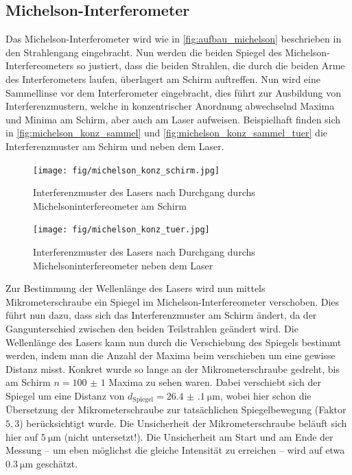 \documentclass[ngerman]{scrartcl}
\begin{document}
\subsection{Michelson-Interferometer}
\label{sec:durchfuehrung_michelson}

Das Michelson-Interferometer wird wie in \autoref{fig:aufbau_michelson} beschrieben in den Strahlengang eingebracht. Nun werden die beiden Spiegel des Michelson-Interfereometers so justiert, dass die beiden Strahlen, die durch die beiden Arme des Interferometers laufen, überlagert am Schirm auftreffen. Nun wird eine Sammellinse vor dem Interferometer eingebracht, dies führt zur Ausbildung von Interferenzmustern, welche in konzentrischer Anordnung abwechselnd Maxima und Minima am Schirm, aber auch am Laser aufweisen. Beispielhaft finden sich in \autoref{fig:michelson_konz_sammel} und \autoref{fig:michelson_konz_sammel_tuer} die Interferenzmuster am Schirm und neben dem Laser.

\setcapindent{0pt}
\begin{figure}[H]
    \centering
    \begin{minipage}[t]{0.45\linewidth}
        \centering
        \texttt{[image: fig/michelson\_konz\_schirm.jpg]}
        \caption{Interferenzmuster des Lasers nach Durchgang durchs Michelsoninterfereometer am Schirm}
        \label{fig:michelson_konz_sammel}
    \end{minipage}%
    \hspace*{\fill}
    \begin{minipage}[t]{0.45\linewidth}
        \centering
        \texttt{[image: fig/michelson\_konz\_tuer.jpg]}
        \caption{Interferenzmuster des Lasers nach Durchgang durchs Michelsoninterfereometer neben dem Laser}
        \label{fig:michelson_konz_sammel_tuer}
    \end{minipage}
\end{figure}
\setcaphanging

Zur Bestimmung der Wellenlänge des Lasers wird nun mittels Mikrometerschraube ein Spiegel im Michelson-Interfereometer verschoben. Dies führt nun dazu, dass sich das Interferenzmuster am Schirm ändert, da der Gangunterschied zwischen den beiden Teilstrahlen geändert wird. Die Wellenlänge des Lasers kann nun durch die Verschiebung des Spiegels bestimmt werden, indem man die Anzahl der Maxima beim verschieben um eine gewisse Distanz misst. Konkret wurde so lange an der Mikrometerschraube gedreht, bis am Schirm $n = \num{100(1)}$ Maxima zu sehen waren. Dabei verschiebt sich der Spiegel um eine Distanz von $d_\text{Spiegel} = \SI{26.4(1)}{\micro\meter}$, wobei hier schon die Übersetzung der Mikrometerschraube zur tatsächlichen Spiegelbewegung (Faktor $5,3$) berücksichtigt wurde. Die Unsicherheit der Mikrometerschraube beläuft sich hier auf $\SI{5}{\micro\meter}$ (nicht untersetzt!). Die Unsicherheit am Start und am Ende der Messung -- um eben möglichst die gleiche Intensität zu erreichen -- wird auf etwa $\SI{0.3}{\micro\meter}$ geschätzt.
\end{document}

